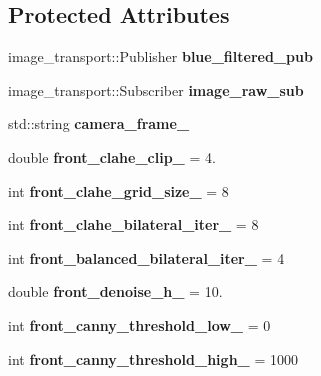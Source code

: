 \subsection*{Protected Attributes}
\begin{DoxyCompactItemize}
\item 
\mbox{\label{classOctagon_ad81ad65b8cfd994d4c8e9ff920cbbc72}} 
image\+\_\+transport\+::\+Publisher {\bfseries blue\+\_\+filtered\+\_\+pub}
\item 
\mbox{\label{classOctagon_ac730f845f82658b1cad679699d492878}} 
image\+\_\+transport\+::\+Subscriber {\bfseries image\+\_\+raw\+\_\+sub}
\item 
\mbox{\label{classOctagon_a134b4a5d27fa1f771c928a2cf2441eac}} 
std\+::string {\bfseries camera\+\_\+frame\+\_\+}
\item 
\mbox{\label{classOctagon_a18101d0809a701a880a71da13a867c32}} 
double {\bfseries front\+\_\+clahe\+\_\+clip\+\_\+} = 4.
\item 
\mbox{\label{classOctagon_a7ac3f3216b3b65a631e2966d9fe947d6}} 
int {\bfseries front\+\_\+clahe\+\_\+grid\+\_\+size\+\_\+} = 8
\item 
\mbox{\label{classOctagon_a37e874f2b6b0defbadf34637e655d462}} 
int {\bfseries front\+\_\+clahe\+\_\+bilateral\+\_\+iter\+\_\+} = 8
\item 
\mbox{\label{classOctagon_a6526833743c9afd65cbed7e5b2f54168}} 
int {\bfseries front\+\_\+balanced\+\_\+bilateral\+\_\+iter\+\_\+} = 4
\item 
\mbox{\label{classOctagon_a71822dfc8d160896ff4193935ec78a0e}} 
double {\bfseries front\+\_\+denoise\+\_\+h\+\_\+} = 10.
\item 
\mbox{\label{classOctagon_a65a3ea1eb703a5c45abcac586e190bbc}} 
int {\bfseries front\+\_\+canny\+\_\+threshold\+\_\+low\+\_\+} = 0
\item 
\mbox{\label{classOctagon_a588fd8490c6e59ba0c59b8c0c0def6dc}} 
int {\bfseries front\+\_\+canny\+\_\+threshold\+\_\+high\+\_\+} = 1000

\end{DoxyCompactItemize}
